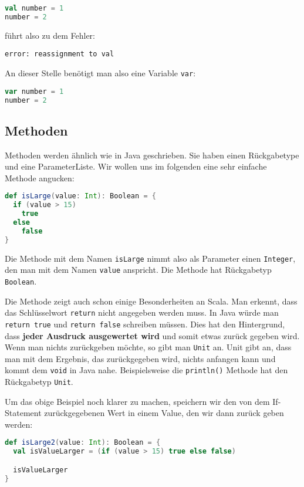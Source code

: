 \begin{lstlisting}[language=Scala,numbers=none]
val number = 1
number = 2
\end{lstlisting}

führt also zu dem Fehler:
\begin{verbatim}
error: reassignment to val
\end{verbatim}

An dieser Stelle benötigt man also eine Variable \texttt{var}:

\begin{lstlisting}[language=Scala,numbers=none]
var number = 1
number = 2
\end{lstlisting}

\subsection{Methoden}
Methoden werden ähnlich wie in Java geschrieben. Sie haben einen Rückgabetype und eine ParameterListe. Wir wollen uns im folgenden eine sehr einfache Methode angucken:

\begin{lstlisting}[language=Scala]
def isLarge(value: Int): Boolean = {
  if (value > 15)
    true
  else
    false
}
\end{lstlisting}

Die Methode mit dem Namen \texttt{isLarge} nimmt also als Parameter einen \texttt{Integer}, den man mit dem Namen \texttt{value} anspricht. Die Methode hat Rückgabetyp \texttt{Boolean}.

Die Methode zeigt auch schon einige Besonderheiten an Scala. Man erkennt, dass das Schlüsselwort \texttt{return} nicht angegeben werden muss. In Java würde man \texttt{return true} und \texttt{return false} schreiben müssen. Dies hat den Hintergrund, dass \textbf{jeder Ausdruck ausgewertet wird} und somit etwas zurück gegeben wird. Wenn man nichts zurückgeben möchte, so gibt man \texttt{Unit} an. Unit gibt an, dass man mit dem Ergebnis, das zurückgegeben wird, nichts anfangen kann und kommt dem \texttt{void} in Java nahe. Beispielsweise die \texttt{println()} Methode hat den Rückgabetyp \texttt{Unit}.

Um das obige Beispiel noch klarer zu machen, speichern wir den von dem If-Statement zurückgegebenen Wert in einem Value, den wir dann zurück geben werden:

\begin{lstlisting}[language=Scala]
def isLarge2(value: Int): Boolean = {
  val isValueLarger = (if (value > 15) true else false)

  isValueLarger
}
\end{lstlisting}

